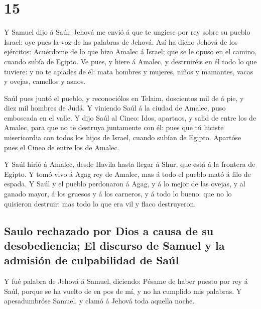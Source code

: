 \hypertarget{section-09-15}{%
\section{15}\label{section-09-15}}

 Y Samuel dijo á Saúl: Jehová me envió á que te ungiese
por rey sobre su pueblo Israel: oye pues la voz de las palabras de
Jehová.  Así ha dicho Jehová de los ejércitos: Acuérdome
de lo que hizo Amalec á Israel; que se le opuso en el camino, cuando
subía de Egipto.  Ve pues, y hiere á Amalec, y destruiréis
en él todo lo que tuviere: y no te apiades de él: mata hombres y
mujeres, niños y mamantes, vacas y ovejas, camellos y asnos.

 Saúl pues juntó el pueblo, y reconociólos en Telaim,
doscientos mil de á pie, y diez mil hombres de Judá.  Y
viniendo Saúl á la ciudad de Amalec, puso emboscada en el valle.
 Y dijo Saúl al Cineo: Idos, apartaos, y salid de entre
los de Amalec, para que no te destruya juntamente con él: pues que tú
hiciste misericordia con todos los hijos de Israel, cuando subían de
Egipto. Apartóse pues el Cineo de entre los de Amalec.

 Y Saúl hirió á Amalec, desde Havila hasta llegar á Shur,
que está á la frontera de Egipto.  Y tomó vivo á Agag rey
de Amalec, mas á todo el pueblo mató á filo de espada.  Y
Saúl y el pueblo perdonaron á Agag, y á lo mejor de las ovejas, y al
ganado mayor, á los gruesos y á los carneros, y á todo lo bueno: que no
lo quisieron destruir: mas todo lo que era vil y flaco destruyeron.

\hypertarget{saulo-rechazado-por-dios-a-causa-de-su-desobediencia-el-discurso-de-samuel-y-la-admisiuxf3n-de-culpabilidad-de-sauxfal}{%
\subsection{Saulo rechazado por Dios a causa de su desobediencia; El
discurso de Samuel y la admisión de culpabilidad de
Saúl}\label{saulo-rechazado-por-dios-a-causa-de-su-desobediencia-el-discurso-de-samuel-y-la-admisiuxf3n-de-culpabilidad-de-sauxfal}}

 Y fué palabra de Jehová á Samuel, diciendo:
 Pésame de haber puesto por rey á Saúl, porque se ha
vuelto de en pos de mí, y no ha cumplido mis palabras. Y apesadumbróse
Samuel, y clamó á Jehová toda aquella noche.

